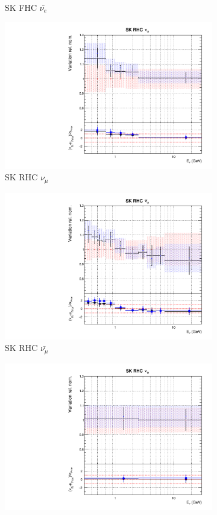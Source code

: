 \begin{figure}
\begin{subfigure}{0.45\textwidth}
  \caption{SK FHC $\bar{\nu_{e}}$}
\end{subfigure}
\begin{subfigure}{0.45\textwidth}
  \centering
  \includegraphics[width=0.75\linewidth]{figs/comp5q2vs8q2flux12}
  \caption{SK RHC $\nu_{\mu}$}
\end{subfigure}
\begin{subfigure}{0.45\textwidth}
  \centering
  \includegraphics[width=0.75\linewidth]{figs/comp5q2vs8q2flux13}
  \caption{SK RHC $\bar{\nu_{\mu}}$}
\end{subfigure}
\begin{subfigure}{0.45\textwidth}
  \centering
  \includegraphics[width=0.75\linewidth]{figs/comp5q2vs8q2flux14}

\end{subfigure}
\end{figure}
